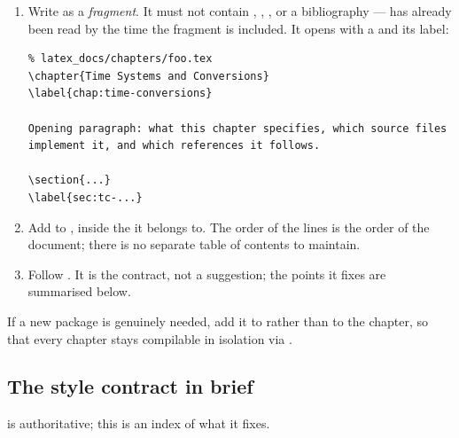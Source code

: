\begin{enumerate}[leftmargin=1.6em]
  \item Write  as a \emph{fragment}. It must
    not contain ,
    , ,
    or a bibliography ---  has already been read by the time
    the fragment is included. It opens with a
     and its label:
\begin{lstlisting}
% latex_docs/chapters/foo.tex
\chapter{Time Systems and Conversions}
\label{chap:time-conversions}

Opening paragraph: what this chapter specifies, which source files
implement it, and which references it follows.

\section{...}
\label{sec:tc-...}
\end{lstlisting}
  \item Add  to
    , inside the  it belongs to. The
    order of the  lines is the order of the
    document; there is no separate table of contents to maintain.
  \item Follow . It is the contract, not a suggestion; the
    points it fixes are summarised below.
\end{enumerate}

If a new package is genuinely needed, add it to  rather than
to the chapter, so that every chapter stays compilable in isolation via
.

\subsection{The style contract in brief}

 is authoritative; this is an index of what it fixes.


